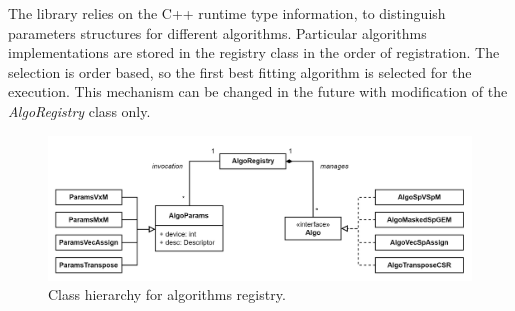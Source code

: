 The library relies on the C++ runtime type information, to distinguish parameters structures for different algorithms. Particular algorithms implementations are stored in the registry class in the order of registration. The selection is order based, so the first best fitting algorithm is selected for the execution. This mechanism can be changed in the future with modification of the \textit{AlgoRegistry} class only.

\begin{figure}
    \centering
    \includegraphics[width=1.0\textwidth]{images/algo_registry_classes.png}
    \caption{Class hierarchy for algorithms registry.}
    \label{fig:algo_reg_classes}
\end{figure}